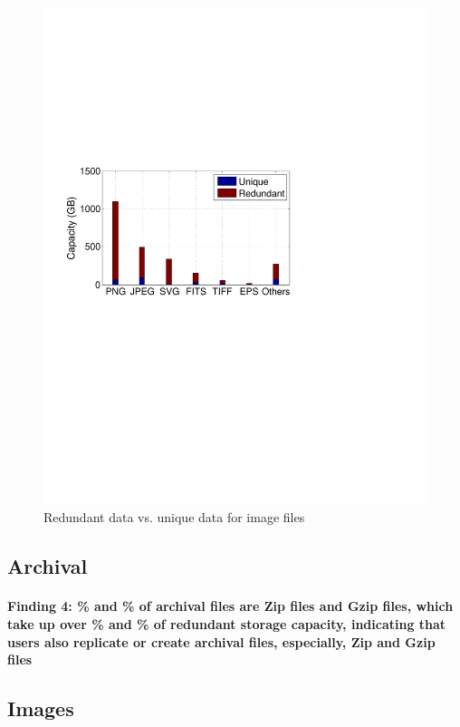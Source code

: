 \begin{figure}[t]
\begin{minipage}{0.28\textwidth}
		\includegraphics[width=1\textwidth]{graphs/type-image-cap}
		\caption{Redundant data vs. unique data for image files}
		\label{fig:type-img}
	\end{minipage}
\end{figure}

\subsection{Archival}
\paragraph{Finding 4: \% and \% of archival files are Zip files and Gzip files, which take up over \% and \% of redundant storage capacity, indicating that users also replicate or create archival files, especially, Zip and Gzip files}

\subsection{Images}
